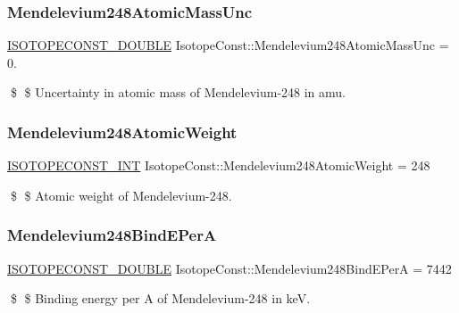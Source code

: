 \subsubsection{\texorpdfstring{Mendelevium248\+Atomic\+Mass\+Unc}{Mendelevium248AtomicMassUnc}}
{\footnotesize\ttfamily \mbox{\hyperlink{group___isotope_const-_macros_ga8f45a7272ce02c0b4c65c44636ed719a}{I\+S\+O\+T\+O\+P\+E\+C\+O\+N\+S\+T\+\_\+\+D\+O\+U\+B\+LE}} Isotope\+Const\+::\+Mendelevium248\+Atomic\+Mass\+Unc = 0.}

\$ \$ Uncertainty in atomic mass of Mendelevium-\/248 in amu. \mbox{\label{group___isotope_const-_mendelevium-_md248_gaab9b8bdf9611aa0f82e50b5bd7bb6111}} 
\subsubsection{\texorpdfstring{Mendelevium248\+Atomic\+Weight}{Mendelevium248AtomicWeight}}
{\footnotesize\ttfamily \mbox{\hyperlink{group___isotope_const-_macros_ga5f18360b3e99483a35c32d789e62621c}{I\+S\+O\+T\+O\+P\+E\+C\+O\+N\+S\+T\+\_\+\+I\+NT}} Isotope\+Const\+::\+Mendelevium248\+Atomic\+Weight = 248}

\$ \$ Atomic weight of Mendelevium-\/248. \mbox{\label{group___isotope_const-_mendelevium-_md248_ga4b37583db79233b55ceee1ad544d624a}} 
\subsubsection{\texorpdfstring{Mendelevium248\+Bind\+E\+PerA}{Mendelevium248BindEPerA}}
{\footnotesize\ttfamily \mbox{\hyperlink{group___isotope_const-_macros_ga8f45a7272ce02c0b4c65c44636ed719a}{I\+S\+O\+T\+O\+P\+E\+C\+O\+N\+S\+T\+\_\+\+D\+O\+U\+B\+LE}} Isotope\+Const\+::\+Mendelevium248\+Bind\+E\+PerA = 7442}

\$ \$ Binding energy per A of Mendelevium-\/248 in keV. \mbox{\label{group___isotope_const-_mendelevium-_md248_ga4a517a96332c49e20888c1a5a187aae5}} 
